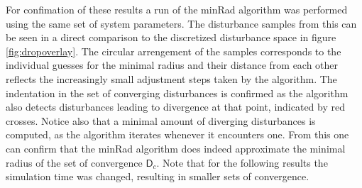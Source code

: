     For confimation of these results a run of the minRad algorithm was performed using the same set of system parameters. The disturbance samples from this can be seen in a direct comparison to the discretized disturbance space in figure \ref{fig:dropoverlay}. The circular arrengement of the samples corresponds to the individual guesses for the minimal radius and their distance from each other reflects the increasingly small adjustment steps taken by the algorithm. The indentation in the set of converging disturbances is confirmed as the algorithm also detects disturbances leading to divergence at that point, indicated by red crosses. Notice also that a minimal amount of diverging disturbances is computed, as the algorithm iterates whenever it encounters one. From this one can confirm that the minRad algorithm does indeed approximate the minimal radius of the set of convergence $\mathsf{D}_c$. Note that for the following results the simulation time was changed, resulting in smaller sets of convergence. 

